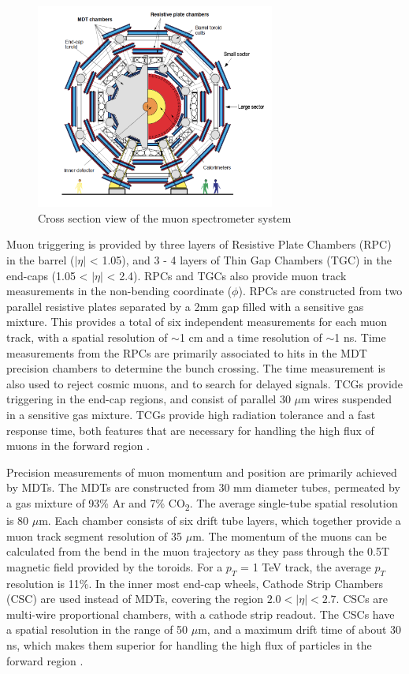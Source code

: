 \begin{figure}
        \centering
	\includegraphics[width=0.7\textwidth]{figures/ch3/muonSpec.png}
	\caption{Cross section view of the muon spectrometer system \cite{muon_tdr} }
	\label{fig:muonSpec}
\end{figure}

Muon triggering is provided by three layers of Resistive Plate Chambers (RPC) in the barrel ($|\eta|$ < 1.05), and 3 - 4 layers of Thin Gap Chambers (TGC) in the end-caps (1.05 < $|\eta|$ < 2.4). RPCs and TGCs also provide muon track measurements in the non-bending coordinate ($\phi$). RPCs are constructed from two parallel resistive plates separated by a 2mm gap filled with a sensitive gas mixture. This provides a total of six independent measurements for each muon track, with a spatial resolution of $\sim$1 cm and a time resolution of $\sim$1 ns. Time measurements from the RPCs are primarily associated to hits in the MDT precision chambers to determine the bunch crossing. The time measurement is also used to reject cosmic muons, and to search for delayed signals. TCGs provide triggering in the end-cap regions, and consist of parallel 30 $\mu$m wires suspended in a sensitive gas mixture. TCGs provide high radiation tolerance and a fast response time, both features that are necessary for handling the high flux of muons in the forward region \cite{muon_tdr}.\par

Precision measurements of muon momentum and position are primarily achieved by MDTs. The MDTs are constructed from 30 mm diameter tubes, permeated by a gas mixture of 93\% Ar and 7\% CO\textsubscript{2}. The average single-tube spatial resolution is 80 $\mu$m. Each chamber consists of six drift tube layers, which together provide a muon track segment resolution of 35 $\mu$m. The momentum of the muons can be calculated from the bend in the muon trajectory as they pass through the 0.5T magnetic field provided by the toroids. For a $p_T$ = 1 TeV track, the average $p_T$ resolution is 11\%. In the inner most end-cap wheels, Cathode Strip Chambers (CSC) are used instead of MDTs, covering the region $2.0 < |\eta| < 2.7$. CSCs are multi-wire proportional chambers, with a cathode strip readout. The CSCs have a spatial resolution in the range of 50 $\mu$m, and a maximum drift time of about 30 ns, which makes them superior for handling the high flux of particles in the forward region \cite{muon_spec}. 

